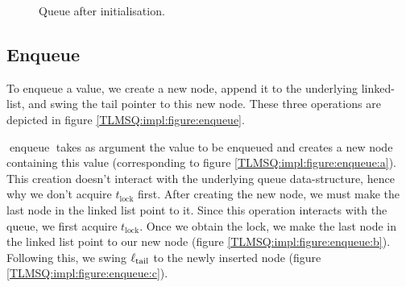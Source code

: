\documentclass[a4paper, 10pt]{report}
\theoremstyle{definition}
\newcommand{\enqueue}{\operatorname{enqueue}}
\newcommand{\locinM}[1]{\loc_{#1\_\mathrm{in}}}
\newcommand{\locoutM}[1]{\loc_{#1\_\mathrm{out}}}
\newcommand{\locN}[1]{\loc_{\mathrm{#1}}}
\newcommand{\lochead}{\locN{head}}
\newcommand{\loctail}{\locN{tail}}
\newcommand{\node}{x}
\newcommand{\Tlock}{t_{\mathrm{lock}}}
\begin{document}
\begin{figure}
  \centering
  \begin{adjustbox}{center}
  \end{adjustbox}
  \caption{Queue after initialisation.}
  \label{TLMSQ:impl:figure:init}
\end{figure}

\subsection{Enqueue}
\label{TLMSQ:implementation:sub:enqueue}

To enqueue a value, we create a new node, append it to the underlying linked-list, and swing the tail pointer to this new node. These three operations are depicted in figure \ref{TLMSQ:impl:figure:enqueue}.

$\enqueue$ takes as argument the value to be enqueued and creates a new node containing this value (corresponding to figure \ref{TLMSQ:impl:figure:enqueue:a}). This creation doesn't interact with the underlying queue data-structure, hence why we don't acquire $\Tlock$ first. After creating the new node, we must make the last node in the linked list point to it. Since this operation interacts with the queue, we first acquire $\Tlock$. Once we obtain the lock, we make the last node in the linked list point to our new node (figure \ref{TLMSQ:impl:figure:enqueue:b}). Following this, we swing $\loctail$ to the newly inserted node (figure \ref{TLMSQ:impl:figure:enqueue:c}).
\end{document}
